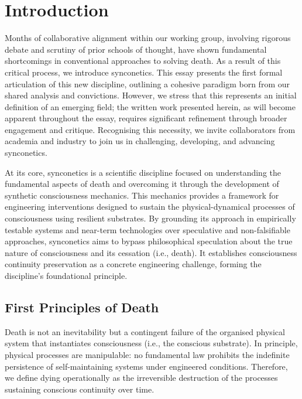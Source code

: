 \documentclass[10pt]{article}
\begin{document}
\begin{sloppypar}
  \section{Introduction}
  \label{sec:introduction}

  Months of collaborative alignment within our working group, involving rigorous debate and scrutiny of prior schools of thought, have shown fundamental shortcomings in conventional approaches to solving death. As a result of this critical process, we introduce synconetics. This essay presents the first formal articulation of this new discipline, outlining a cohesive paradigm born from our shared analysis and convictions. However, we stress that this represents an initial definition of an emerging field; the written work presented herein, as will become apparent throughout the essay, requires significant refinement through broader engagement and critique. Recognising this necessity, we invite collaborators from academia and industry to join us in challenging, developing, and advancing synconetics.

  At its core, synconetics is a scientific discipline focused on understanding the fundamental aspects of death and overcoming it through the development of synthetic consciousness mechanics. This mechanics provides a framework for engineering interventions designed to sustain the physical-dynamical processes of consciousness using resilient substrates. By grounding its approach in empirically testable systems and near-term technologies over speculative and non-falsifiable approaches, synconetics aims to bypass philosophical speculation about the true nature of consciousness and its cessation (i.e., death). It establishes consciousness continuity preservation as a concrete engineering challenge, forming the discipline’s foundational principle.

  \subsection{First Principles of Death}
  \label{sec:first-principles}

  Death is not an inevitability but a contingent failure of the organised physical system that instantiates consciousness (i.e., the conscious substrate). In principle, physical processes are manipulable: no fundamental law prohibits the indefinite persistence of self-maintaining systems under engineered conditions. Therefore, we define dying operationally as the irreversible destruction of the processes sustaining conscious continuity over time.


\end{sloppypar}
\end{document}
